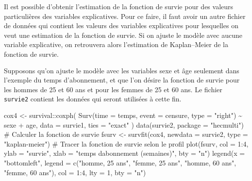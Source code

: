 \documentclass[
  11pt,
  letterpaper,
]{book}
\newenvironment{Shaded}{\begin{snugshade}}{\end{snugshade}}
\newcommand{\AttributeTok}[1]{\textcolor[rgb]{0.40,0.45,0.13}{#1}}
\newcommand{\CommentTok}[1]{\textcolor[rgb]{0.37,0.37,0.37}{#1}}
\newcommand{\DecValTok}[1]{\textcolor[rgb]{0.68,0.00,0.00}{#1}}
\newcommand{\FunctionTok}[1]{\textcolor[rgb]{0.28,0.35,0.67}{#1}}
\newcommand{\NormalTok}[1]{\textcolor[rgb]{0.00,0.23,0.31}{#1}}
\newcommand{\OtherTok}[1]{\textcolor[rgb]{0.00,0.23,0.31}{#1}}
\newcommand{\SpecialCharTok}[1]{\textcolor[rgb]{0.37,0.37,0.37}{#1}}
\newcommand{\StringTok}[1]{\textcolor[rgb]{0.13,0.47,0.30}{#1}}
\theoremstyle{definition}
\theoremstyle{remark}
\begin{document}
Il est possible d'obtenir l'estimation de la fonction de survie pour des
valeurs particulières des variables explicatives. Pour ce faire, il faut
avoir un autre fichier de données qui contient les valeurs des variables
explicatives pour lesquelles on veut une estimation de la fonction de
survie. Si on ajuste le modèle avec aucune variable explicative, on
retrouvera alors l'estimation de Kaplan--Meier de la fonction de survie.

Supposons qu'on ajuste le modèle avec les variables sexe et âge
seulement dans l'exemple du temps d'abonnement, et que l'on désire la
fonction de survie pour les hommes de 25 et 60 ans et pour les femmes de
25 et 60 ans. Le fichier \texttt{survie2} contient les données qui
seront utilisées à cette fin.

\begin{Shaded}
\begin{Highlighting}[]
\NormalTok{cox4 }\OtherTok{\textless{}{-}}\NormalTok{ survival}\SpecialCharTok{::}\FunctionTok{coxph}\NormalTok{(}
  \FunctionTok{Surv}\NormalTok{(}\AttributeTok{time =}\NormalTok{ temps, }
       \AttributeTok{event =}\NormalTok{ censure, }
       \AttributeTok{type =} \StringTok{"right"}\NormalTok{) }\SpecialCharTok{\textasciitilde{}}
\NormalTok{    sexe }\SpecialCharTok{+}\NormalTok{ age,}
  \AttributeTok{data =}\NormalTok{ survie1,}
  \AttributeTok{ties =} \StringTok{"exact"}
\NormalTok{)}
\FunctionTok{data}\NormalTok{(survie2, }\AttributeTok{package =} \StringTok{"hecmulti"}\NormalTok{)}
\CommentTok{\# Calculer la fonction de survie}
\NormalTok{fsurv }\OtherTok{\textless{}{-}} \FunctionTok{survfit}\NormalTok{(cox4, }
             \AttributeTok{newdata =}\NormalTok{ survie2, }
             \AttributeTok{type =} \StringTok{"kaplan{-}meier"}\NormalTok{)}
\CommentTok{\# Tracer la fonction de survie selon le profil}
\FunctionTok{plot}\NormalTok{(fsurv,}
     \AttributeTok{col =} \DecValTok{1}\SpecialCharTok{:}\DecValTok{4}\NormalTok{,}
     \AttributeTok{ylab =} \StringTok{"survie"}\NormalTok{,}
     \AttributeTok{xlab =} \StringTok{"temps d\textquotesingle{}abonnement (semaines)"}\NormalTok{,}
     \AttributeTok{bty =} \StringTok{"n"}\NormalTok{)}
\FunctionTok{legend}\NormalTok{(}\AttributeTok{x =} \StringTok{"bottomleft"}\NormalTok{,}
       \AttributeTok{legend =} \FunctionTok{c}\NormalTok{(}\StringTok{"homme, 25 ans"}\NormalTok{, }
                  \StringTok{"femme, 25 ans"}\NormalTok{,}
                  \StringTok{"homme, 60 ans"}\NormalTok{, }
                  \StringTok{"femme, 60 ans"}\NormalTok{),}
       \AttributeTok{col =} \DecValTok{1}\SpecialCharTok{:}\DecValTok{4}\NormalTok{,}
       \AttributeTok{lty =} \DecValTok{1}\NormalTok{,}
       \AttributeTok{bty =} \StringTok{"n"}\NormalTok{)}
\end{Highlighting}
\end{Shaded}
\end{document}
